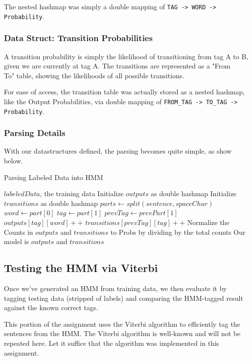 \documentclass[11pt]{article}
\begin{document}
The nested hashmap was simply a double mapping of \texttt{TAG -> WORD -> Probability}.

\subsubsection{Data Struct: Transition Probabilities}
A transition probability is simply the likelihood of transitioning from tag A to B, given
we are currently at tag A.  The transitions are represented as a "From\\To"
table, showing the likelihoods of all possible transitions.

For ease of access, the transition table was actually stored as a nested hashmap, like the Output
Probabilities, via double mapping of \texttt{FROM\_TAG -> TO\_TAG -> Probability}.

\subsubsection{Parsing Details}
With our datastructures defined, the parsing becomes quite simple, as show below.

\begin{algorithm}
\caption{Parsing Labeled Data into HMM}\label{alg:parse}
\begin{algorithmic}[1]
\Require $labeledData$, the training data
\State Initialize $outputs$ as double hashmap
\State Initialize $transitions$ as double hashmap
\State $parts \gets split(sentence, spaceChar)$
\State $word \gets part[0] $
\State $tag \gets part[1] $
\State $prevTag \gets prevPart[1] $
\State $outputs[tag][word]++ $
\State $transitions[prevTag][tag]++ $
\EndFor
\EndFor
\State Normalize the Counts in $outputs$ and $transitions$ to Probs by dividing by the total counts
\State Our model is $outputs$ and $transitions$
\end{algorithmic}
\end{algorithm}


\subsection{Testing the HMM via Viterbi}
Once we've generated an HMM from training data, we then evaluate it by
tagging testing data (stripped of labels) and comparing the HMM-tagged
result against the known correct tags.

This portion of the assignment uses the Viterbi algorithm to efficiently
tag the sentences from the HMM.  The Viterbi algorithm is well-known and
will not be repeated here.  Let it suffice that the algorithm was implemented
in this assignment.
\end{document}
